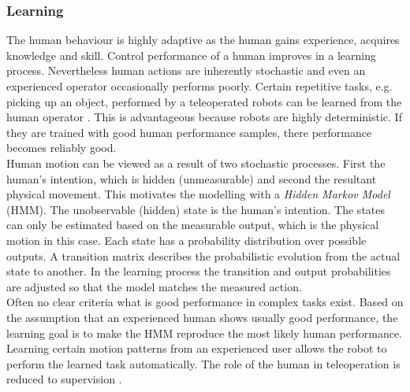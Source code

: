 \documentclass[a4paper,twoside, openright,12pt]{report}
\begin{document}
\subsubsection{Learning}
The human behaviour is highly adaptive as the human gains experience, acquires knowledge and skill. Control performance of a human improves in a learning process. Nevertheless human actions are inherently stochastic and even an experienced operator occasionally performs poorly. Certain repetitive tasks, e.g. picking up an object, performed by a teleoperated robots can be learned from the human operator \cite{Yang94}. This is advantageous because robots are highly deterministic. If they are trained with good human performance samples, there performance becomes reliably good.\\
Human motion can be viewed as a result of two stochastic processes. First the human's intention, which is hidden (unmeasurable) and second the resultant physical movement. This motivates the modelling with a \emph{Hidden Markov Model} (HMM). The unobservable (hidden) state is the human's intention. The states can only be estimated based on the measurable output, which is the physical motion in this case. Each state has a probability distribution over possible outputs. A transition matrix describes the probabilistic evolution from the actual state to another. In the learning process the transition and output probabilities are adjusted so that the model matches the measured action. \\
Often no clear criteria what is good performance in complex tasks exist. Based on the assumption that an experienced human shows usually good performance, the learning goal is to make the HMM reproduce the most likely human performance.\\
Learning certain motion patterns from an experienced user allows the robot to perform the learned task automatically. The role of the human in teleoperation is reduced to supervision \cite{Yang94}. 
\end{document}
